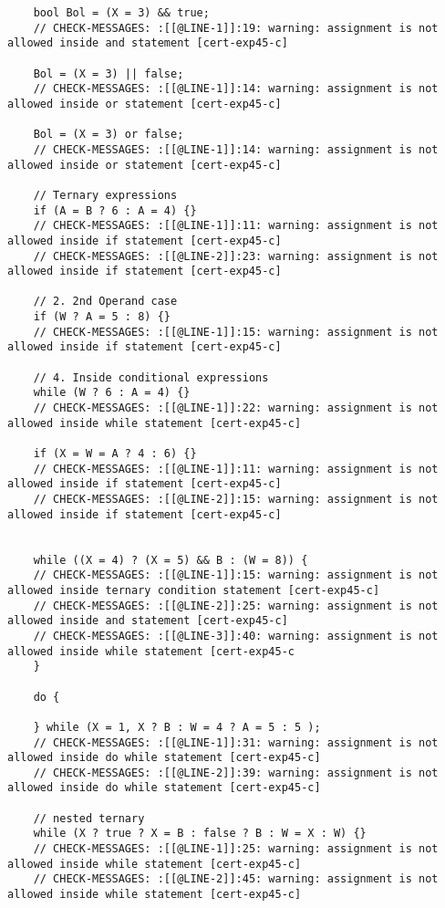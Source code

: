 \begin{code}
\begin{verbatim}
    bool Bol = (X = 3) && true;
    // CHECK-MESSAGES: :[[@LINE-1]]:19: warning: assignment is not allowed inside and statement [cert-exp45-c]

    Bol = (X = 3) || false;
    // CHECK-MESSAGES: :[[@LINE-1]]:14: warning: assignment is not allowed inside or statement [cert-exp45-c]
   
    Bol = (X = 3) or false;
    // CHECK-MESSAGES: :[[@LINE-1]]:14: warning: assignment is not allowed inside or statement [cert-exp45-c]

    // Ternary expressions
    if (A = B ? 6 : A = 4) {}
    // CHECK-MESSAGES: :[[@LINE-1]]:11: warning: assignment is not allowed inside if statement [cert-exp45-c]
    // CHECK-MESSAGES: :[[@LINE-2]]:23: warning: assignment is not allowed inside if statement [cert-exp45-c]

    // 2. 2nd Operand case
    if (W ? A = 5 : 8) {}
    // CHECK-MESSAGES: :[[@LINE-1]]:15: warning: assignment is not allowed inside if statement [cert-exp45-c]

    // 4. Inside conditional expressions
    while (W ? 6 : A = 4) {}
    // CHECK-MESSAGES: :[[@LINE-1]]:22: warning: assignment is not allowed inside while statement [cert-exp45-c]

    if (X = W = A ? 4 : 6) {}
    // CHECK-MESSAGES: :[[@LINE-1]]:11: warning: assignment is not allowed inside if statement [cert-exp45-c]
    // CHECK-MESSAGES: :[[@LINE-2]]:15: warning: assignment is not allowed inside if statement [cert-exp45-c]


    while ((X = 4) ? (X = 5) && B : (W = 8)) {
    // CHECK-MESSAGES: :[[@LINE-1]]:15: warning: assignment is not allowed inside ternary condition statement [cert-exp45-c]
    // CHECK-MESSAGES: :[[@LINE-2]]:25: warning: assignment is not allowed inside and statement [cert-exp45-c]
    // CHECK-MESSAGES: :[[@LINE-3]]:40: warning: assignment is not allowed inside while statement [cert-exp45-c
    }

    do {

    } while (X = 1, X ? B : W = 4 ? A = 5 : 5 );
    // CHECK-MESSAGES: :[[@LINE-1]]:31: warning: assignment is not allowed inside do while statement [cert-exp45-c]
    // CHECK-MESSAGES: :[[@LINE-2]]:39: warning: assignment is not allowed inside do while statement [cert-exp45-c]

    // nested ternary
    while (X ? true ? X = B : false ? B : W = X : W) {}
    // CHECK-MESSAGES: :[[@LINE-1]]:25: warning: assignment is not allowed inside while statement [cert-exp45-c]
    // CHECK-MESSAGES: :[[@LINE-2]]:45: warning: assignment is not allowed inside while statement [cert-exp45-c]


\end{verbatim}
\end{code}
